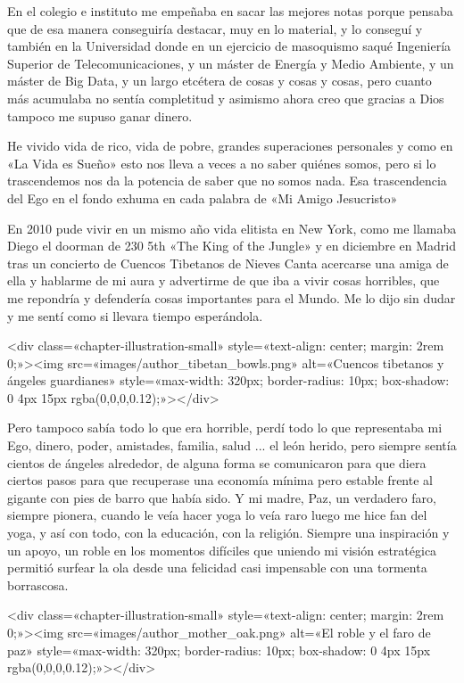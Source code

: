\documentclass[11pt,a5paper]{book}
\begin{document}
En el colegio e instituto me empeñaba en sacar las mejores notas porque pensaba que de esa manera conseguiría destacar, muy en lo material, y lo conseguí y también en la Universidad donde en un ejercicio de masoquismo saqué Ingeniería Superior de Telecomunicaciones, y un máster de Energía y Medio Ambiente, y un máster de Big Data, y un largo etcétera de cosas y cosas y cosas, pero cuanto más acumulaba no sentía completitud y asimismo ahora creo que gracias a Dios tampoco me supuso ganar dinero.

He vivido vida de rico, vida de pobre, grandes superaciones personales y como en «La Vida es Sueño» esto nos lleva a veces a no saber quiénes somos, pero si lo trascendemos nos da la potencia de saber que no somos nada. Esa trascendencia del Ego en el fondo exhuma en cada palabra de «Mi Amigo Jesucristo»

En 2010 pude vivir en un mismo año vida elitista en New York, como me llamaba Diego el doorman de 230 5th «The King of the Jungle» y en diciembre en Madrid tras un concierto de Cuencos Tibetanos de Nieves Canta acercarse una amiga de ella y hablarme de mi aura y advertirme de que iba a vivir cosas horribles, que me repondría y defendería cosas importantes para el Mundo. Me lo dijo sin dudar y me sentí como si llevara tiempo esperándola. 

<div class=«chapter-illustration-small» style=«text-align: center; margin: 2rem 0;»><img src=«images/author_tibetan_bowls.png» alt=«Cuencos tibetanos y ángeles guardianes» style=«max-width: 320px; border-radius: 10px; box-shadow: 0 4px 15px rgba(0,0,0,0.12);»></div>

Pero tampoco sabía todo lo que era horrible, perdí todo lo que representaba mi Ego, dinero, poder, amistades, familia, salud ... el león herido, pero siempre sentía cientos de ángeles alrededor, de alguna forma se comunicaron para que diera ciertos pasos para que recuperase una economía mínima pero estable frente al gigante con pies de barro que había sido. Y mi madre, Paz, un verdadero faro, siempre pionera, cuando le veía hacer yoga lo veía raro luego me hice fan del yoga, y así con todo, con la educación, con la religión. Siempre una inspiración y un apoyo, un roble en los momentos difíciles que uniendo mi visión estratégica permitió surfear la ola desde una felicidad casi impensable con una tormenta borrascosa. 

<div class=«chapter-illustration-small» style=«text-align: center; margin: 2rem 0;»><img src=«images/author_mother_oak.png» alt=«El roble y el faro de paz» style=«max-width: 320px; border-radius: 10px; box-shadow: 0 4px 15px rgba(0,0,0,0.12);»></div>
\end{document}
